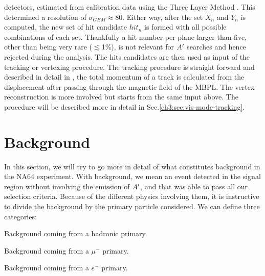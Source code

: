 detectors, estimated from calibration data using the Three Layer Method \cite{Bortfeldt:2014vvt}. This determined a resolution of $\sigma_{GEM} \approx 80$\mum. Either way, after the set $X_n$ and $Y_n$ is computed, the new set of hit candidate $hit_n$ is formed with all possible combinations of each set. Thankfully a hit number per plane larger than five, other than being very rare ($\lesssim$1\%), is not relevant for $A'$ searches and hence rejected during the analysis. The hits candidates are then used as input of the tracking or vertexing procedure. The tracking procedure is straight forward and described in detail in \cite{dbanerjee-thesis}, the total momentum of a track is calculated from the displacement after passing through the magnetic field of the MBPL. The vertex reconstruction is more involved but starts from the same input above. The procedure will be described more in detail in Sec.\ref{ch3:sec:vis-mode-tracking}.

\section{Background}
\label{ch3:sec:bkg}

In this section, we will try to go more in detail of what constitutes background in the NA64 experiment. With background, we mean an event detected in the signal region without involving the emission of $A'$, and that was able to pass all our selection criteria. Because of the different physics involving them, it is instructive to divide the background by the primary particle considered. We can define three categories:

\begin{description}[leftmargin=!,labelwidth=\widthof{\bfseries Electronic background}]
\item[Hadronic background] Background coming from a hadronic primary.
\item[Muonic background] Background coming from a $\mu^-$ primary.
\item[Electronic background] Background coming from a $e^-$ primary.
\end{description}

